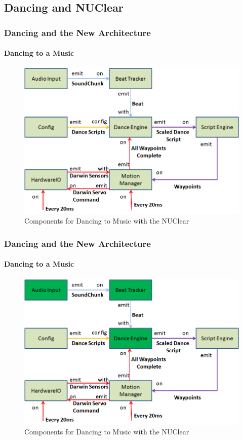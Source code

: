 \documentclass{beamer}
\begin{document}
	\subsection{Dancing and NUClear} %
	\begin{frame}
		\frametitle{Dancing and the New Architecture}
		\framesubtitle{Dancing to a Music}
		\begin{figure}
			\centering
			\includegraphics[scale=.45]{Presentation_Images/dance_audio_new_arc.png}
			\caption{Components for Dancing to Music with the NUClear}
		\end{figure}
	\end{frame}	
	\begin{frame}
		\frametitle{Dancing and the New Architecture}
		\framesubtitle{Dancing to a Music}
		\begin{figure}
			\centering
			\includegraphics[scale=.45]{Presentation_Images/dance_audio_new_arc_change.png}
			\caption{Components for Dancing to Music with the NUClear}
		\end{figure}
	\end{frame}	
\end{document}
